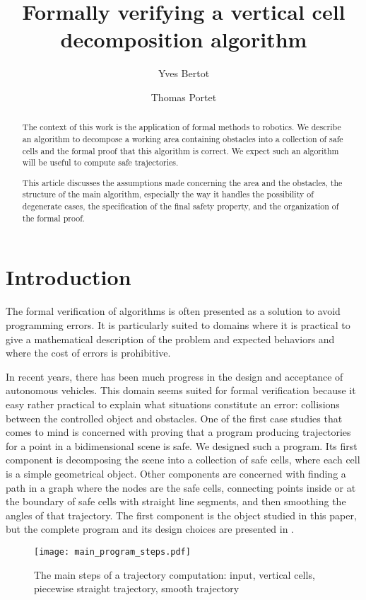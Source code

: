\documentclass[a4paper, USenglish, cleveref, autoref, thm-restate, final]{lipics-v2021}
\title{Formally verifying a vertical cell decomposition algorithm}
\author{Yves Bertot}{Inria Center at Université Côte d'Azur, France}
       {yves.bertot@inria.fr}
       {https://orcid.org/0000-0001-5052-3019}{}
\author{Thomas Portet}{Inria Center at Université Côte d'Azur, France}
       {thomas.portet@inria.fr}
       {}{}
\begin{document}
\maketitle

\begin{abstract}
The context of this work is the application of formal methods to robotics.
We describe an algorithm to decompose a working area
containing obstacles into a collection of safe cells and the formal
proof that this algorithm is correct.  We expect such an
algorithm will be useful to compute safe trajectories.

This article discusses the assumptions made concerning the area and the
obstacles, the structure of the main algorithm, especially the way it handles
the possibility of degenerate cases, the specification of the final safety
property, and the organization of the formal proof.
\end{abstract}

\section{Introduction}
The formal verification of algorithms is often presented as a solution
to avoid programming errors.  It is particularly suited to domains
where it is practical to give a mathematical description of the
problem and expected behaviors and where the cost of errors is
prohibitive.

In recent years, there has been much progress in the design and
acceptance of autonomous vehicles.
This domain seems suited for formal verification because it easy
rather practical to explain what situations constitute an error:
collisions between the controlled object and obstacles.
One of the first case studies that comes to mind
is concerned with proving that a program producing trajectories for a
point in a bidimensional scene is safe.  We designed such a program.
Its first component is decomposing the scene into a collection of safe cells,
where each cell is a simple geometrical object.  Other components are
concerned with finding a path in a graph where the nodes are the safe
cells, connecting points inside or at the boundary of safe cells with
straight line segments, and then smoothing the angles of
that trajectory.  The first component is the
object studied in this paper, but the complete program and its
design choices are presented in \cite{bertot:hal-04312815}.
\begin{figure}
\begin{center}
\texttt{[image: main\_program\_steps.pdf]}
\end{center}
\caption{The main steps of a trajectory computation: input, 
  vertical cells, piecewise straight trajectory, smooth trajectory}
\end{figure}
\end{document}
